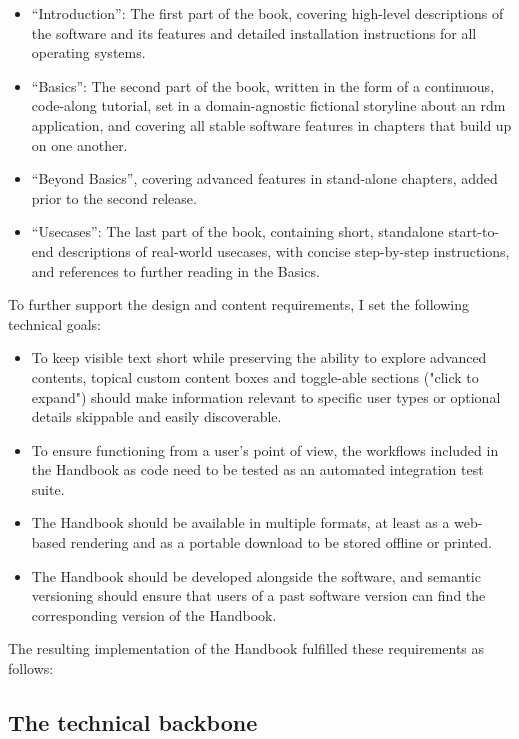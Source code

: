 \begin{itemize}
	\item ``Introduction'': The first part of the book, covering high-level descriptions of the software and its features and detailed installation instructions for all operating systems.
	\item ``Basics'': The second part of the book, written in the form of a continuous, code-along tutorial, set in a domain-agnostic fictional storyline about an \gls{rdm} application, and covering all stable software features in chapters that build up on one another.
	\item ``Beyond Basics'', covering advanced features in stand-alone chapters, added prior to the second release.
	\item ``Usecases'': The last part of the book, containing short, standalone start-to-end descriptions of real-world usecases, with concise step-by-step instructions, and references to further reading in the Basics.
\end{itemize}

To further support the design and content requirements, I set the following technical goals:

\begin{itemize}
	\item To keep visible text short while preserving the ability to explore advanced contents, topical custom content boxes and toggle-able sections ("click to expand") should make information relevant to specific user types or optional details skippable and easily discoverable.
	\item To ensure functioning from a user's point of view, the workflows included in the Handbook as code need to be tested as an automated integration test suite.
	\item The Handbook should be available in multiple formats, at least as a web-based rendering and as a portable download to be stored offline or printed.
	\item The Handbook should be developed alongside the software, and semantic versioning should ensure that users of a past software version can find the corresponding version of the Handbook.
\end{itemize}

The resulting implementation of the Handbook fulfilled these requirements as follows:


\subsection{The technical backbone}

